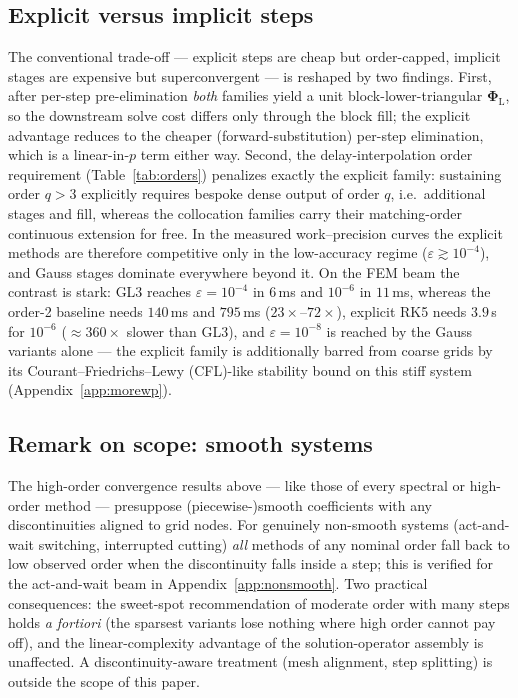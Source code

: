 \documentclass[Afour,sageh,times]{sagej}
\begin{document}
\subsection{Explicit versus implicit steps}
\label{sec:expl-impl}

The conventional trade-off --- explicit steps are cheap but order-capped,
implicit stages are expensive but superconvergent --- is reshaped by two
findings. First, after per-step pre-elimination \emph{both} families yield a
unit block-lower-triangular $\mathbf{\Phi}_\mathrm{L}$, so the downstream
solve cost differs only through the block fill; the explicit advantage
reduces to the cheaper (forward-substitution) per-step elimination, which is
a linear-in-$p$ term either way. Second, the delay-interpolation order
requirement (Table~\ref{tab:orders}) penalizes exactly the explicit family:
sustaining order $q > 3$ explicitly requires bespoke dense output of order
$q$, i.e.\ additional stages and fill, whereas the collocation families carry
their matching-order continuous extension for free. In the measured
work--precision curves the explicit methods are therefore competitive only in
the low-accuracy regime ($\varepsilon \gtrsim 10^{-4}$), and Gauss stages
dominate everywhere beyond it. On the FEM beam the contrast is stark:
GL3 reaches $\varepsilon = 10^{-4}$ in $6$\,ms and $10^{-6}$ in $11$\,ms,
whereas the order-2 baseline needs $140$\,ms and $795$\,ms
($23\times$--$72\times$), explicit RK5 needs $3.9$\,s for $10^{-6}$
($\approx\!360\times$ slower than GL3), and $\varepsilon = 10^{-8}$ is
reached by the Gauss variants alone --- the explicit family is additionally barred from
coarse grids by its Courant--Friedrichs--Lewy (CFL)-like stability bound on
this stiff system
(Appendix~\ref{app:morewp}).

\subsection{Remark on scope: smooth systems}
\label{sec:nonsmooth}

The high-order convergence results above --- like those of every spectral or
high-order method --- presuppose (piecewise-)smooth coefficients with any
discontinuities aligned to grid nodes. For genuinely non-smooth systems
(act-and-wait switching, interrupted cutting) \emph{all} methods of any
nominal order fall back to low observed order when the discontinuity falls
inside a step; this is verified for the act-and-wait beam in
Appendix~\ref{app:nonsmooth}. Two practical consequences: the sweet-spot
recommendation of moderate order with many steps holds \emph{a fortiori}
(the sparsest variants lose nothing where high order cannot pay off), and
the linear-complexity advantage of the solution-operator assembly is
unaffected. A discontinuity-aware treatment (mesh alignment, step splitting)
is outside the scope of this paper.
\end{document}
